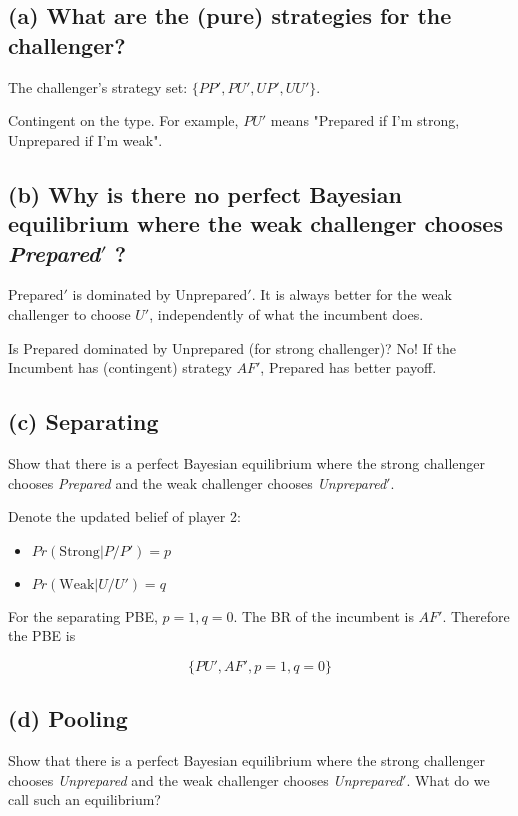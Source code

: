 \documentclass{article}
\begin{document}
\medskip

\subsection*{(a) What are the (pure) strategies for the challenger?} 


The challenger's strategy set: $\{PP', PU', UP', UU'\}$.

\begin{mdframed}[backgroundcolor=blue!20,linecolor=white]
Contingent on the type. For example, $PU'$ means "Prepared if I'm strong, Unprepared if I'm weak".
\end{mdframed}

\subsection*{(b) Why is there no perfect Bayesian equilibrium where the weak challenger chooses
\textit{Prepared}$'$ ? }

Prepared$'$ is dominated by Unprepared$'$.
It is always better for the weak challenger to choose $U'$, independently of
what the incumbent does.

\begin{mdframed}[backgroundcolor=blue!20,linecolor=white]
Is {Prepared} dominated by {Unprepared} (for strong challenger)?
No! If the Incumbent has (contingent) strategy $AF'$, Prepared has better payoff.
\end{mdframed}

\subsection*{(c) Separating}Show that there is a perfect Bayesian equilibrium where the strong challenger chooses
\textit{Prepared} and the weak challenger chooses \textit{Unprepared}$'$. 

Denote the updated belief of player 2:
\begin{itemize}
\item $Pr(\text{Strong} | P/P') = p$
\item $Pr(\text{Weak} | U/U') = q$
\end{itemize}

For the separating PBE, $p=1,q=0$. The BR of the incumbent is
$AF'$. Therefore the PBE is

$$\{PU',AF',p=1,q=0\}$$


\subsection*{(d) Pooling}Show that there is a perfect Bayesian equilibrium where the strong challenger chooses
\textit{Unprepared} and the weak challenger chooses \textit{Unprepared}$'$. What do we call such an
equilibrium? 
\end{document}
